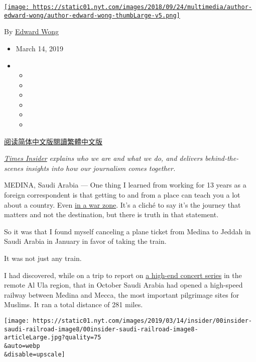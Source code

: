 \href{https://www.nytimes.com/by/edward-wong}{\texttt{[image: https://static01.nyt.com/images/2018/09/24/multimedia/author-edward-wong/author-edward-wong-thumbLarge-v5.png]}}

By \href{https://www.nytimes.com/by/edward-wong}{Edward Wong}

\begin{itemize}
\item
  March 14, 2019
\item
  \begin{itemize}
  \item
  \item
  \item
  \item
  \item
  \item
  \end{itemize}
\end{itemize}

\href{https://cn.nytimes.com/world/20190320/saudi-arabia-high-speed-train-medina-mecca/}{阅读简体中文版}\href{https://cn.nytimes.com/world/20190320/saudi-arabia-high-speed-train-medina-mecca/zh-hant/}{閱讀繁體中文版}

\href{http://www.nytimes.com/section/insider?module=inline}{\emph{Times
Insider}} \emph{explains who we are and what we do, and delivers
behind-the-scenes insights into how our journalism comes together.}

MEDINA, Saudi Arabia --- One thing I learned from working for 13 years
as a foreign correspondent is that getting to and from a place can teach
you a lot about a country. Even
\href{https://www.nytimes.com/2005/06/23/world/middleeast/flight-15-to-basra-fewperks-but-no-bombs.html}{in
a war zone}. It's a cliché to say it's the journey that matters and not
the destination, but there is truth in that statement.

So it was that I found myself canceling a plane ticket from Medina to
Jeddah in Saudi Arabia in January in favor of taking the train.

It was not just any train.

I had discovered, while on a trip to report on
\href{https://www.nytimes.com/2019/02/11/world/middleeast/saudi-arabia-tourism-music-festival.html}{a
high-end concert series} in the remote Al Ula region, that in October
Saudi Arabia had opened a high-speed railway between Medina and Mecca,
the most important pilgrimage sites for Muslims. It ran a total distance
of 281 miles.

\texttt{[image: https://static01.nyt.com/images/2019/03/14/insider/00insider-saudi-railroad-image8/00insider-saudi-railroad-image8-articleLarge.jpg?quality=75\\\&auto=webp\\\&disable=upscale]}


